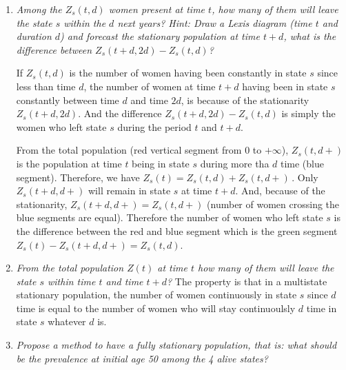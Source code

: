 \documentclass[11pt,letterpaper]{article}
\begin{document}
\begin{enumerate}
\item \emph{ Among the $Z_s(t,d)$ women present at time $t$, how many of them
  will leave the state $s$ within the $d$ next years? Hint: Draw a
  Lexis diagram (time $t$ and duration $d$) and forecast the
  stationary population at time $t+d$, what is the difference between
  $Z_s(t+d,2d)-Z_s(t,d)$?}

If $Z_s(t,d)$ is the number of women having been constantly in state
$s$ since less than time $d$, the number of women at time $t+d$ having
been in state $s$ constantly between time $d$ and time $2d$, is
because of the stationarity $Z_s(t+d,2d)$. And the difference
$Z_s(t+d,2d)-Z_s(t,d)$ is simply the women who left state $s$ during
the period $t$ and $t+d$.

From the total population (red vertical segment from 0 to $+\infty$),
$Z_s(t,d+)$ is the population at time $t$ being in state $s$ during
more tha $d$ time (blue segment). Therefore, we have
$Z_s(t)=Z_s(t,d)+Z_s(t,d+)$\,. Only $Z_s(t+d,d+)$ will remain in state
$s$ at time $t+d$. And, because of the stationarity,
$Z_s(t+d,d+)=Z_s(t,d+)$ (number of women crossing the blue segments
are equal).  Therefore the number of women who left state $s$ is the
difference between the red and blue segment which is the green segment
$Z_s(t) - Z_s(t+d,d+)= Z_s(t,d)$.

\item \emph{ From the total population $Z(t)$ at time $t$ how many of
    them will leave the state $s$ within time $t$ and time $t+d$?}
  The property is that in a multistate stationary population, the
  number of women continuously in state $s$ since $d$ time is equal to
  the number of women who will stay continuoulsly $d$ time in state
  $s$ whatever $d$ is.

  
\item \emph{ Propose a method to have a fully stationary population, that is:
  what should be the prevalence at initial age 50 among the 4 alive
  states?}

\end{enumerate}

\end{document}
